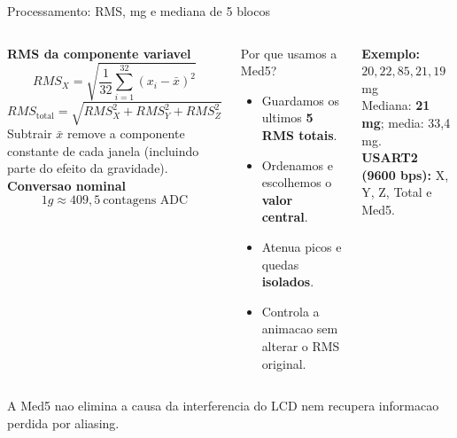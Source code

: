 \documentclass[aspectratio=169,10pt]{beamer}
\newcommand{\etiqueta}[1]{{\color{azul}\bfseries #1}}
\begin{document}
\begin{frame}{Processamento: RMS, mg e mediana de 5 blocos}
\begin{columns}[T,onlytextwidth]
\etiqueta{RMS da componente variavel}\\[-1mm]
\[RMS_X=\sqrt{\frac{1}{32}\sum_{i=1}^{32}(x_i-\bar x)^2}\]
\[RMS_{\mathrm{total}}=\sqrt{RMS_X^2+RMS_Y^2+RMS_Z^2}\]
\small
Subtrair $\bar x$ remove a componente constante de cada janela (incluindo parte do efeito da gravidade).\\[2mm]
\etiqueta{Conversao nominal}\\
\[1g\approx409{,}5\ \text{contagens ADC}\]
\begin{block}{Por que usamos a Med5?}
\begin{itemize}\setlength\itemsep{3pt}
\item Guardamos os ultimos \textbf{5 RMS totais}.
\item Ordenamos e escolhemos o \textbf{valor central}.
\item Atenua picos e quedas \textbf{isolados}.
\item Controla a animacao sem alterar o RMS original.
\end{itemize}
\end{block}
\vspace{1mm}
\small\textbf{Exemplo:} $20,22,85,21,19$ mg\\
Mediana: \textbf{21 mg}; media: 33,4 mg.\\[3mm]
\textbf{USART2 (9600 bps):} X, Y, Z, Total e Med5.
\end{columns}
\vfill
{\scriptsize\color{gray}A Med5 nao elimina a causa da interferencia do LCD nem recupera informacao perdida por aliasing.}
\end{frame}
\end{document}
